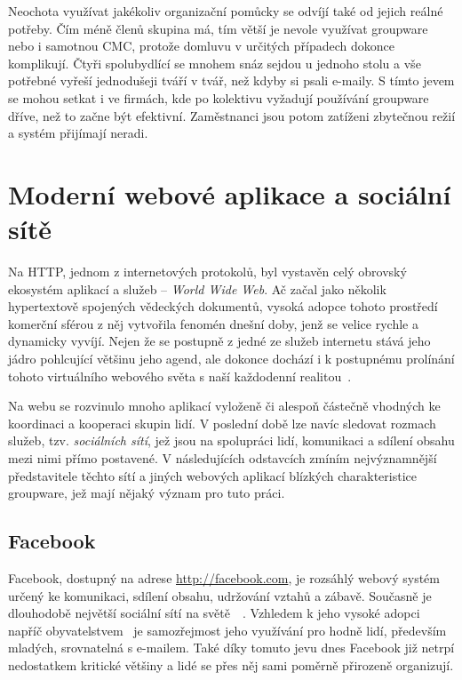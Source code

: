 \documentclass[12pt,oneside,final]{fithesis2}
\begin{document}
Neochota využívat jakékoliv organizační pomůcky se odvíjí také od jejich reálné potřeby. Čím méně členů skupina má, tím větší je nevole využívat groupware nebo i samotnou CMC, protože domluvu v určitých případech dokonce komplikují. Čtyři spolubydlící se mnohem snáz sejdou u jednoho stolu a vše potřebné vyřeší jednodušeji tváří v tvář, než kdyby si psali e-maily. S tímto jevem se mohou setkat i ve firmách, kde po kolektivu vyžadují používání groupware dříve, než to začne být efektivní. Zaměstnanci jsou potom zatíženi zbytečnou režií a systém přijímají neradi.


\section{Moderní webové aplikace a sociální sítě}\label{web}
Na HTTP, jednom z internetových protokolů, byl vystavěn celý obrovský ekosystém aplikací a služeb -- \emph{World Wide Web}. Ač začal jako několik hypertextově spojených vědeckých dokumentů, vysoká adopce tohoto prostředí komerční sférou z něj vytvořila fenomén dnešní doby, jenž se velice rychle a dynamicky vyvíjí. Nejen že se postupně z jedné ze služeb internetu stává jeho jádro pohlcující většinu jeho agend, ale dokonce dochází i k postupnému prolínání tohoto virtuálního webového světa s naší každodenní realitou~\cite{thurlow2004computer}.

Na webu se rozvinulo mnoho aplikací vyloženě či alespoň částečně vhodných ke koordinaci a kooperaci skupin lidí. V poslední době lze navíc sledovat rozmach služeb, tzv. \emph{sociálních sítí}, jež jsou na spolupráci lidí, komunikaci a sdílení obsahu mezi nimi přímo postavené. V následujících odstavcích zmíním nejvýznamnější představitele těchto sítí a jiných webových aplikací blízkých charakteristice groupware, jež mají nějaký význam pro tuto práci.

\subsection{Facebook}\label{facebook}
Facebook, dostupný na adrese \url{http://facebook.com}, je rozsáhlý webový systém určený ke komunikaci, sdílení obsahu, udržování vztahů a zábavě. Současně je dlouhodobě největší sociální sítí na světě~\cite{kazeniac2009social}~\cite{protalinski2012facebook}. Vzhledem k jeho vysoké adopci napříč obyvatelstvem~\cite{docekal2011socialni} je samozřejmost jeho využívání pro hodně lidí, především mladých, srovnatelná s e-mailem. Také díky tomuto jevu dnes Facebook již netrpí nedostatkem kritické většiny a lidé se přes něj sami poměrně přirozeně organizují.
\end{document}
